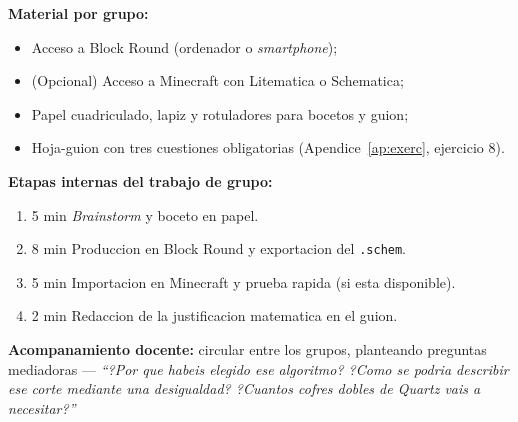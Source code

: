 \documentclass[12pt,a4paper]{scrartcl}
\newcommand{\tempo}[1]{\textnormal{\footnotesize\color{bg!90!white}\textsf{#1}}}
\begin{document}
\begin{actividad}[5.3 --- Produccion \quad\tempo{20 min}]\label{at:53}
\textbf{Material por grupo:}
\begin{itemize}[leftmargin=1.3em,itemsep=0.15em,topsep=0.3em,nosep]
  \item Acceso a Block Round (ordenador o \emph{smartphone});
  \item (Opcional) Acceso a Minecraft con Litematica o Schematica;
  \item Papel cuadriculado, lapiz y rotuladores para bocetos y guion;
  \item Hoja-guion con tres cuestiones obligatorias (Apendice~\ref{ap:exerc}, ejercicio 8).
\end{itemize}

\textbf{Etapas internas del trabajo de grupo:}
\begin{enumerate}[leftmargin=1.5em,itemsep=0.15em,topsep=0.3em,nosep]
  \item \tempo{5 min} \emph{Brainstorm} y boceto en papel.
  \item \tempo{8 min} Produccion en Block Round y exportacion del \texttt{.schem}.
  \item \tempo{5 min} Importacion en Minecraft y prueba rapida (si esta disponible).
  \item \tempo{2 min} Redaccion de la justificacion matematica en el guion.
\end{enumerate}

\textbf{Acompanamiento docente:} circular entre los grupos, planteando preguntas mediadoras --- \emph{\enquote{?Por que habeis elegido ese algoritmo? ?Como se podria describir ese corte mediante una desigualdad? ?Cuantos cofres dobles de Quartz vais a necesitar?}}
\end{actividad}
\end{document}
